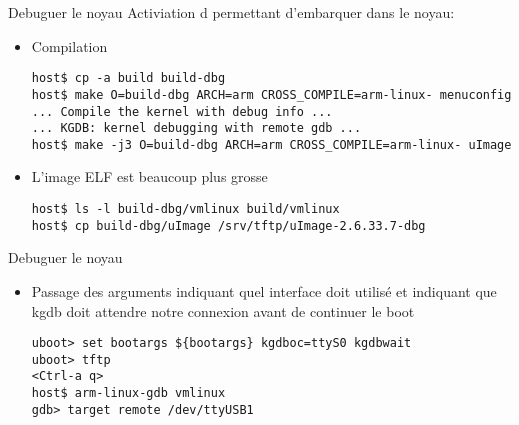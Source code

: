 
\begin{frame}[fragile=singleslide]{Debuguer le noyau}
  Activiation d  permettant d'embarquer  dans
  le noyau:
  \begin{itemize}
  \item Compilation
    \begin{lstlisting}
host$ cp -a build build-dbg
host$ make O=build-dbg ARCH=arm CROSS_COMPILE=arm-linux- menuconfig
... Compile the kernel with debug info ...
... KGDB: kernel debugging with remote gdb ...
host$ make -j3 O=build-dbg ARCH=arm CROSS_COMPILE=arm-linux- uImage
    \end{lstlisting} 
  \item L'image ELF est beaucoup plus grosse
    \begin{lstlisting}
host$ ls -l build-dbg/vmlinux build/vmlinux
host$ cp build-dbg/uImage /srv/tftp/uImage-2.6.33.7-dbg
    \end{lstlisting} 
  \end{itemize}
\end{frame}

\begin{frame}[fragile=singleslide]{Debuguer le noyau}
  \begin{itemize}
  \item  Passage des arguments   indiquant  quel interface
     doit utilisé et   indiquant que kgdb doit
    attendre notre connexion avant de continuer le boot
    \begin{lstlisting}
uboot> set bootargs ${bootargs} kgdboc=ttyS0 kgdbwait
uboot> tftp
<Ctrl-a q>
host$ arm-linux-gdb vmlinux 
gdb> target remote /dev/ttyUSB1
    \end{lstlisting} 
  \end{itemize}
\end{frame}

